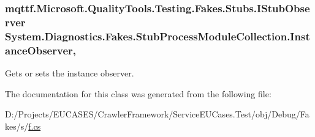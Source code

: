 \hypertarget{class_system_1_1_diagnostics_1_1_fakes_1_1_stub_process_module_collection_a8c812740fa3b06d14937cadf01246c8a}{
\subsubsection[{Instance\-Observer}]{\setlength{\rightskip}{0pt plus 5cm}mqttf.\-Microsoft.\-Quality\-Tools.\-Testing.\-Fakes.\-Stubs.\-I\-Stub\-Observer System.\-Diagnostics.\-Fakes.\-Stub\-Process\-Module\-Collection.\-Instance\-Observer\hspace{0.3cm}{\ttfamily [get]}, {\ttfamily [set]}}}\label{class_system_1_1_diagnostics_1_1_fakes_1_1_stub_process_module_collection_a8c812740fa3b06d14937cadf01246c8a}


Gets or sets the instance observer.



The documentation for this class was generated from the following file\-:\begin{DoxyCompactItemize}
\item 
D\-:/\-Projects/\-E\-U\-C\-A\-S\-E\-S/\-Crawler\-Framework/\-Service\-E\-U\-Cases.\-Test/obj/\-Debug/\-Fakes/s/\hyperlink{s_2f_8cs}{f.\-cs}\end{DoxyCompactItemize}
